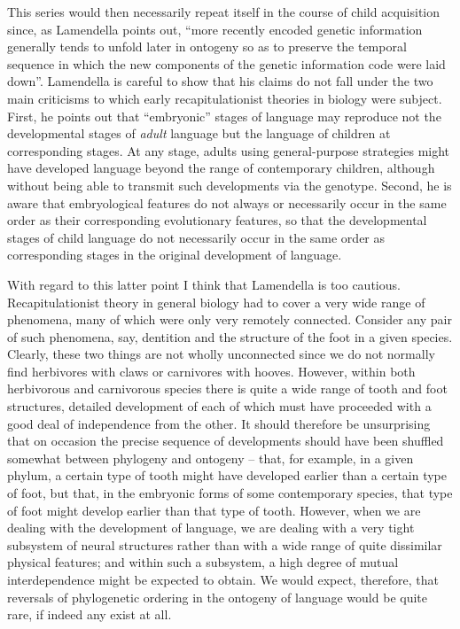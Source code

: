 This series would then necessarily repeat itself in the course of child acquisition since, as Lamendella points out, ``more recently encoded genetic information generally tends to unfold later in ontogeny so as to preserve the temporal sequence in which the new components of the genetic information code were laid down''. Lamendella is careful to show that his claims do not fall under the two main criticisms to which early recapitulationist theories in biology were subject. First, he points out that ``embryonic'' stages of language may reproduce not the developmental stages of \textit{adult} language but the language of children at corresponding stages. At any stage, adults using general-purpose strategies might have developed language beyond the range of contemporary children, although without being able to transmit such developments via the genotype. Second, he is aware that embryological features do not always or necessarily occur in the same order as their corresponding evolutionary features, so that the developmental stages of child language do not necessarily occur in the same order as corre\-sponding stages in the original development of language.

\largerpage[-1]
With regard to this latter point I think that Lamendella is too cautious. Recapitulationist theory in general biology had to cover a very wide range of phenomena, many of which were only very re\-motely connected. Consider any pair of such phenomena, say, dentition and the structure of the foot in a given species. Clearly, these two things are not wholly unconnected since we do not normally find herbivores with claws or carnivores with hooves. However, within both herbivorous and carnivorous species there is quite a wide range of tooth and foot structures, detailed development of each of which must have proceeded with a good deal of independence from the other. It should therefore be unsurprising that on occasion the precise sequence of developments should have been shuffled somewhat between phylogeny and ontogeny -- that, for example, in a given phylum, a certain type of tooth might have developed earlier than a certain type of foot, but that, in the embryonic forms of some contemporary species, that type
of foot might develop earlier than that type of tooth. However, when we are dealing with the development of language, we are dealing with a very tight subsystem of neural structures rather than with a wide range of quite dissimilar physical features; and within such a sub\-system, a high degree of mutual interdependence might be expected to obtain. We would expect, therefore, that reversals of phylogenetic ordering in the ontogeny of language would be quite rare, if indeed any exist at all.

